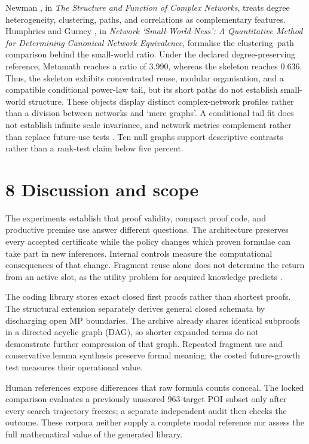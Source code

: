 \documentclass[pdflatex,sn-basic,Numbered]{sn-jnl}
\begin{document}
Newman \citep{Newman2003}, in \emph{The Structure and Function of Complex Networks}, treats degree heterogeneity, clustering, paths, and correlations as complementary features. Humphries and Gurney \citep{HumphriesGurney2008}, in \emph{Network `Small-World-Ness': A Quantitative Method for Determining Canonical Network Equivalence}, formalise the clustering--path comparison behind the small-world ratio. Under the declared degree-preserving reference, Metamath reaches a ratio of 3.990, whereas the skeleton reaches 0.636. Thus, the skeleton exhibits concentrated reuse, modular organisation, and a compatible conditional power-law tail, but its short paths do not establish small-world structure. These objects display distinct complex-network profiles rather than a division between networks and `mere graphs'. A conditional tail fit does not establish infinite scale invariance, and network metrics complement rather than replace future-use tests \citep{ClausetEtAl2009,BroidoClauset2019}. Ten null graphs support descriptive contrasts rather than a rank-test claim below five percent.

\section*{8 Discussion and scope}\label{discussion-and-scope}

The experiments establish that proof validity, compact proof code, and productive premise use answer different questions. The architecture preserves every accepted certificate while the policy changes which proven formulae can take part in new inferences. Internal controls measure the computational consequences of that change. Fragment reuse alone does not determine the return from an active slot, as the utility problem for acquired knowledge predicts \citep{Minton1990Utility}.

The coding library stores exact closed first proofs rather than shortest proofs. The structural extension separately derives general closed schemata by discharging open MP boundaries. The archive already shares identical subproofs in a directed acyclic graph (DAG), so shorter expanded terms do not demonstrate further compression of that graph. Repeated fragment use and conservative lemma synthesis preserve formal meaning; the costed future-growth test measures their operational value.

Human references expose differences that raw formula counts conceal. The locked comparison evaluates a previously unscored 963-target POI subset only after every search trajectory freezes; a separate independent audit then checks the outcome. These corpora neither supply a complete modal reference nor assess the full mathematical value of the generated library.
\end{document}
